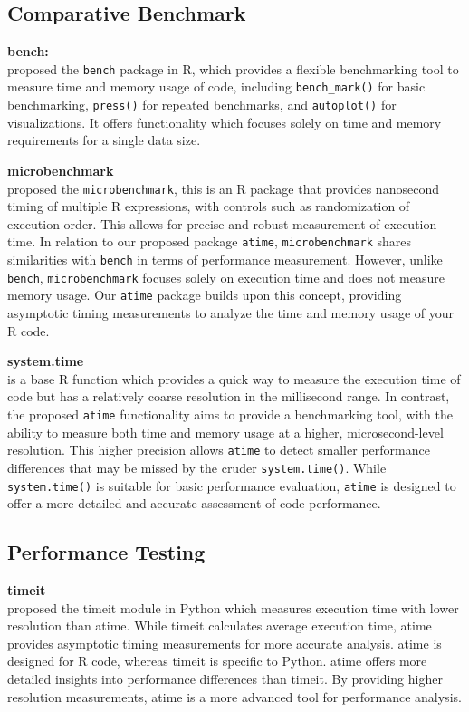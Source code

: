 \subsection{Comparative Benchmark}

\textbf{bench:} \\
\citet{bench} proposed the \texttt{bench} package in R, which provides a flexible benchmarking tool to measure time and memory usage of code, including \texttt{bench\_mark()} for basic benchmarking, \texttt{press()} for repeated benchmarks, and \texttt{autoplot()} for visualizations. It offers functionality which focuses solely on time and memory requirements for a single data size.
\vspace{0.1in}

\textbf{microbenchmark} \\
\citet{microbenchmark} proposed the \texttt{microbenchmark}, this is an R package that provides nanosecond timing of multiple R expressions, with controls such as randomization of execution order. This allows for precise and robust measurement of execution time. In relation to our proposed package \texttt{atime}, \texttt{microbenchmark} shares similarities with \texttt{bench} in terms of performance measurement. However, unlike \texttt{bench}, \texttt{microbenchmark} focuses solely on execution time and does not measure memory usage. Our \texttt{atime} package builds upon this concept, providing asymptotic timing measurements to analyze the time and memory usage of your R code.
\vspace{0.1in}

\textbf{system.time} \\
\citet{system.time} is a base R function which provides a quick way to measure the execution time of code but has a relatively coarse resolution in the millisecond range. In contrast, the proposed \texttt{atime} functionality aims to provide a benchmarking tool, with the ability to measure both time and memory usage at a higher, microsecond-level resolution. This higher precision allows \texttt{atime} to detect smaller performance differences that may be missed by the cruder \texttt{system.time()}. While \texttt{system.time()} is suitable for basic performance evaluation, \texttt{atime} is designed to offer a more detailed and accurate assessment of code performance.
\vspace{0.1in}


\subsection{Performance Testing}
\textbf{timeit} \\
\citet{timeit} proposed the timeit module in Python which measures execution time with lower resolution than atime. While timeit calculates average execution time, atime provides asymptotic timing measurements for more accurate analysis. atime is designed for R code, whereas timeit is specific to Python. atime offers more detailed insights into performance differences than timeit. By providing higher resolution measurements, atime is a more advanced tool for performance analysis.
\vspace{0.1in}

